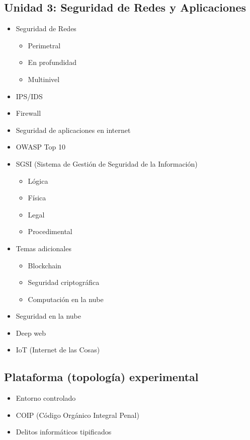 \documentclass[12pt,a4paper]{article}
\begin{document}
\subsection{Unidad 3: Seguridad de Redes y Aplicaciones}
\begin{itemize}
    \item Seguridad de Redes
    \begin{itemize}
        \item Perimetral
        \item En profundidad
        \item Multinivel
    \end{itemize}
    \item IPS/IDS
    \item Firewall
    \item Seguridad de aplicaciones en internet
    \item OWASP Top 10
    \item SGSI (Sistema de Gestión de Seguridad de la Información)
    \begin{itemize}
        \item Lógica
        \item Física
        \item Legal
        \item Procedimental
    \end{itemize}
    \item Temas adicionales
    \begin{itemize}
        \item Blockchain
        \item Seguridad criptográfica
        \item Computación en la nube
    \end{itemize}
    \item Seguridad en la nube
    \item Deep web
    \item IoT (Internet de las Cosas)
\end{itemize}

\subsection{Plataforma (topología) experimental}
\begin{itemize}
    \item Entorno controlado
    \item COIP (Código Orgánico Integral Penal)
    \item Delitos informáticos tipificados
\end{itemize}
\end{document}
